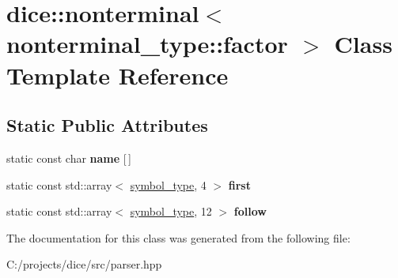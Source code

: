 \hypertarget{classdice_1_1nonterminal_3_01nonterminal__type_1_1factor_01_4}{}\section{dice\+:\+:nonterminal$<$ nonterminal\+\_\+type\+:\+:factor $>$ Class Template Reference}
\label{classdice_1_1nonterminal_3_01nonterminal__type_1_1factor_01_4}
\subsection*{Static Public Attributes}
\begin{DoxyCompactItemize}
\item 
\mbox{\label{classdice_1_1nonterminal_3_01nonterminal__type_1_1factor_01_4_af194940c14f77c2883114c1764dc57bb}} 
static const char {\bfseries name} \mbox{[}$\,$\mbox{]}
\item 
\mbox{\label{classdice_1_1nonterminal_3_01nonterminal__type_1_1factor_01_4_a974be1eeeae580b9e6442340e02ef4a9}} 
static const std\+::array$<$ \mbox{\hyperlink{symbols_8hpp_ab0295a855bb7eadc138abd6993af3aea}{symbol\+\_\+type}}, 4 $>$ {\bfseries first}
\item 
\mbox{\label{classdice_1_1nonterminal_3_01nonterminal__type_1_1factor_01_4_a4016566c1d20e2b8265be7e07568a660}} 
static const std\+::array$<$ \mbox{\hyperlink{symbols_8hpp_ab0295a855bb7eadc138abd6993af3aea}{symbol\+\_\+type}}, 12 $>$ {\bfseries follow}
\end{DoxyCompactItemize}


The documentation for this class was generated from the following file\+:\begin{DoxyCompactItemize}
\item 
C\+:/projects/dice/src/parser.\+hpp\end{DoxyCompactItemize}
